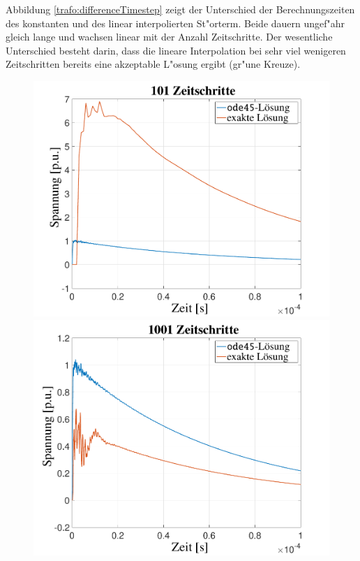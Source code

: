 \begin{refsection}
Abbildung \ref{trafo:differenceTimestep} zeigt der Unterschied der Berechnungszeiten des konstanten und des linear interpolierten St"orterm. Beide dauern ungef"ahr gleich lange und wachsen linear mit der Anzahl Zeitschritte. Der wesentliche Unterschied besteht darin, dass die lineare Interpolation bei sehr viel wenigeren Zeitschritten bereits eine akzeptable L"osung ergibt (gr"une Kreuze).
	\begin{figure}
	    \centering
	    \begin{minipage}{.32\textwidth}
	        \centering
	        \includegraphics[width=\linewidth]{./trafo/images/Sprung101.pdf}
	    \end{minipage}%
	    \begin{minipage}{.32\textwidth}
	        \centering
	        \includegraphics[width=\linewidth]{./trafo/images/Sprung1001.pdf}

\end{minipage}
\end{figure}
\end{refsection}
